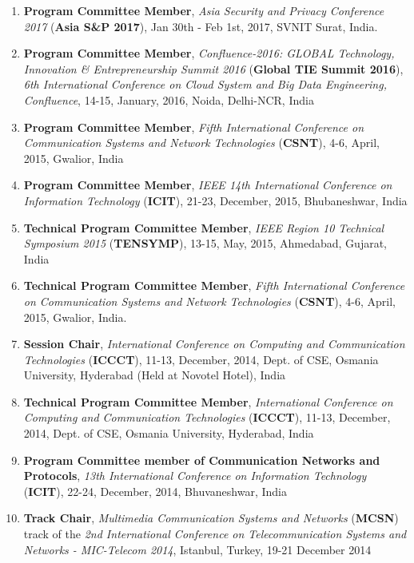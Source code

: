 \begin{enumerate}
\item
\textbf{Program Committee Member}, \textit{Asia Security and Privacy Conference 2017} (\textbf{Asia S\&P 2017}), Jan 30th - Feb 1st, 2017, SVNIT Surat, India.

\item
\textbf{Program Committee Member},  \textit{Confluence-2016: GLOBAL Technology, Innovation \& Entrepreneurship Summit 2016 }(\textbf{Global TIE Summit 2016}),\textit{ 6th International Conference on Cloud System and Big Data Engineering, Confluence}, 14-15, January, 2016, Noida, Delhi-NCR, India

\item
\textbf{Program Committee Member},  \textit{Fifth International Conference on Communication Systems and Network Technologies }(\textbf{CSNT}), 4-6, April, 2015, Gwalior, India

\item
\textbf{Program Committee Member}, \textit{IEEE 14th International Conference on Information Technology} (\textbf{ICIT}), 21-23, December, 2015, Bhubaneshwar, India

\item
\textbf{Technical Program Committee Member}, \textit{IEEE Region 10 Technical Symposium 2015} (\textbf{TENSYMP}), 13-15, May, 2015, Ahmedabad, Gujarat, India

\item
\textbf{Technical Program Committee Member}, \textit{Fifth International Conference on Communication Systems and Network Technologies} (\textbf{CSNT}), 4-6, April, 2015, Gwalior, India.

\item
\textbf{Session Chair}, \textit{International Conference on Computing and Communication Technologies} (\textbf{ICCCT}), 11-13, December, 2014, Dept. of CSE, Osmania University, Hyderabad (Held at Novotel Hotel), India

\item
\textbf{Technical Program Committee Member}, \textit{International Conference on Computing and Communication Technologies }(\textbf{ICCCT}), 11-13, December, 2014, Dept. of CSE, Osmania University, Hyderabad, India

\item
\textbf{Program Committee member of Communication Networks and Protocols}, \textit{13th International Conference on Information Technology} (\textbf{ICIT}), 22-24, December, 2014, Bhuvaneshwar, India

\item
\textbf{Track Chair}, \textit{Multimedia Communication Systems and Networks }(\textbf{MCSN}) track of the \textit{2nd International Conference on Telecommunication Systems and Networks - MIC-Telecom 2014}, Istanbul, Turkey, 19-21 December 2014 



\end{enumerate}
